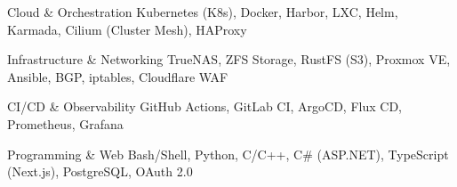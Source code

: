 \vspace{-0.4cm} %

\vspace{-0.25cm} 

\begin{cvskills}

  \cvskill
    {Cloud \& Orchestration} 
    {Kubernetes (K8s), Docker, Harbor, LXC, Helm, Karmada, Cilium (Cluster Mesh), HAProxy} 

  \cvskill
    {Infrastructure \& Networking} 
    {TrueNAS, ZFS Storage, RustFS (S3), Proxmox VE, Ansible, BGP, iptables, Cloudflare WAF} 

  \cvskill
    {CI/CD \& Observability} 
    {GitHub Actions, GitLab CI, ArgoCD, Flux CD, Prometheus, Grafana} 

  \cvskill
    {Programming \& Web} 
    {Bash/Shell, Python, C/C++, C\# (ASP.NET), TypeScript (Next.js), PostgreSQL, OAuth 2.0} 

\end{cvskills}